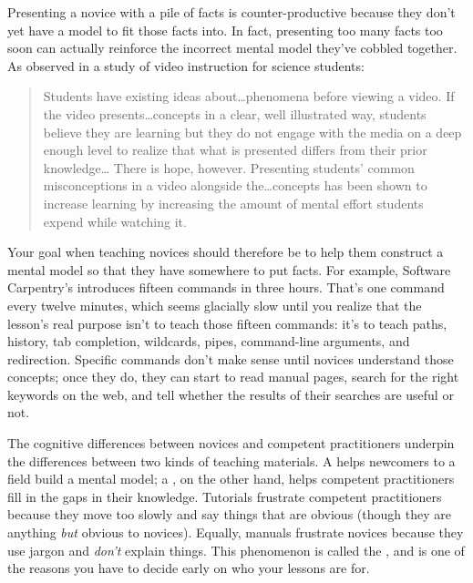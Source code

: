 Presenting a novice with a pile of facts is counter-productive
because they don't yet have a model to fit those facts into.
In fact,
presenting too many facts too soon can actually reinforce
the incorrect mental model they've cobbled together.
As \cite{Mull2007a} observed in a study of video instruction for science students:

\begin{quote}

  Students have existing ideas about{\ldots}phenomena before viewing a video.
  If the video presents{\ldots}concepts in a clear, well illustrated way,
  students believe they are learning but they do not engage with the media on a deep enough level
  to realize that what is presented differs from their prior knowledge{\ldots}
  There is hope, however.
  Presenting students' common misconceptions in a video alongside the{\ldots}concepts
  has been shown to increase learning
  by increasing the amount of mental effort students expend while watching it.

\end{quote}

Your goal when teaching novices should therefore be
to help them construct a mental model
so that they have somewhere to put facts.
For example,
Software Carpentry's
introduces fifteen commands in three hours.
That's one command every twelve minutes,
which seems glacially slow until you realize that
the lesson's real purpose isn't to teach those fifteen commands:
it's to teach paths,
history,
tab completion,
wildcards,
pipes,
command-line arguments,
and redirection.
Specific commands don't make sense until novices understand those concepts;
once they do,
they can start to read manual pages,
search for the right keywords on the web,
and tell whether the results of their searches are useful or not.

The cognitive differences between novices and competent practitioners
underpin the differences between two kinds of teaching materials.
A  helps newcomers to a field build a mental model;
a ,
on the other hand,
helps competent practitioners fill in the gaps in their knowledge.
Tutorials frustrate competent practitioners because they move too slowly
and say things that are obvious
(though they are anything \emph{but} obvious to novices).
Equally,
manuals frustrate novices because they use jargon and \emph{don't} explain things.
This phenomenon is called the  \cite{Kaly2003},
and is one of the reasons you have to decide early on
who your lessons are for.

